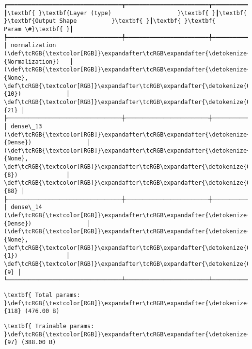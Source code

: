 \documentclass[11pt]{article}
\begin{document}
    
    
    \begin{Verbatim}[commandchars=\\\{\}]
┏━━━━━━━━━━━━━━━━━━━━━━━━━━━━━━━━━┳━━━━━━━━━━━━━━━━━━━━━━━━┳━━━━━━━━━━━━━━━┓
┃\textbf{ }\textbf{Layer (type)                   }\textbf{ }┃\textbf{ }\textbf{Output Shape          }\textbf{ }┃\textbf{ }\textbf{      Param \#}\textbf{ }┃
┡━━━━━━━━━━━━━━━━━━━━━━━━━━━━━━━━━╇━━━━━━━━━━━━━━━━━━━━━━━━╇━━━━━━━━━━━━━━━┩
│ normalization (\def\tcRGB{\textcolor[RGB]}\expandafter\tcRGB\expandafter{\detokenize{0,135,255}}{Normalization})   │ (\def\tcRGB{\textcolor[RGB]}\expandafter\tcRGB\expandafter{\detokenize{0,215,255}}{None}, \def\tcRGB{\textcolor[RGB]}\expandafter\tcRGB\expandafter{\detokenize{0,175,0}}{10})             │            \def\tcRGB{\textcolor[RGB]}\expandafter\tcRGB\expandafter{\detokenize{0,175,0}}{21} │
├─────────────────────────────────┼────────────────────────┼───────────────┤
│ dense\_13 (\def\tcRGB{\textcolor[RGB]}\expandafter\tcRGB\expandafter{\detokenize{0,135,255}}{Dense})                │ (\def\tcRGB{\textcolor[RGB]}\expandafter\tcRGB\expandafter{\detokenize{0,215,255}}{None}, \def\tcRGB{\textcolor[RGB]}\expandafter\tcRGB\expandafter{\detokenize{0,175,0}}{8})              │            \def\tcRGB{\textcolor[RGB]}\expandafter\tcRGB\expandafter{\detokenize{0,175,0}}{88} │
├─────────────────────────────────┼────────────────────────┼───────────────┤
│ dense\_14 (\def\tcRGB{\textcolor[RGB]}\expandafter\tcRGB\expandafter{\detokenize{0,135,255}}{Dense})                │ (\def\tcRGB{\textcolor[RGB]}\expandafter\tcRGB\expandafter{\detokenize{0,215,255}}{None}, \def\tcRGB{\textcolor[RGB]}\expandafter\tcRGB\expandafter{\detokenize{0,175,0}}{1})              │             \def\tcRGB{\textcolor[RGB]}\expandafter\tcRGB\expandafter{\detokenize{0,175,0}}{9} │
└─────────────────────────────────┴────────────────────────┴───────────────┘

    \end{Verbatim}

    
    
    \begin{Verbatim}[commandchars=\\\{\}]
\textbf{ Total params: }\def\tcRGB{\textcolor[RGB]}\expandafter\tcRGB\expandafter{\detokenize{0,175,0}}{118} (476.00 B)

    \end{Verbatim}

    
    
    \begin{Verbatim}[commandchars=\\\{\}]
\textbf{ Trainable params: }\def\tcRGB{\textcolor[RGB]}\expandafter\tcRGB\expandafter{\detokenize{0,175,0}}{97} (388.00 B)

    \end{Verbatim}
\end{document}
